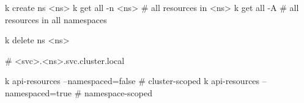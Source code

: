 
\begin{cheatcodebashbold}
k create ns <ns>
k get all -n <ns>   # all resources in <ns>
k get all -A        # all resources in all namespaces
\end{cheatcodebashbold}

\begin{cheatcodebashbold}
k delete ns <ns>
\end{cheatcodebashbold}

\begin{cheatcodebashbold}
# <svc>.<ns>.svc.cluster.local
\end{cheatcodebashbold}

\begin{cheatcodebash}
k api-resources --namespaced=false # cluster-scoped
k api-resources --namespaced=true  # namespace-scoped
\end{cheatcodebash}

